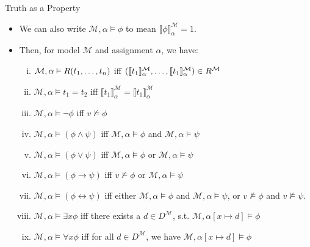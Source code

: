 \begin{frame}{Truth as a Property}

	\begin{itemize}%
	\itemsep=16pt
	
		\item We can also write $\mathcal{M},\alpha\vDash\phi$ to mean $\llbracket\phi\rrbracket^\mathcal{M}_\alpha=1$.
		
		\item Then, for model $\mathcal{M}$ and assignment $\alpha$, we have:

			\medskip
			
			\begin{enumerate}[(i)]
			\itemsep=6pt
			
				\item $\mathcal{M},\alpha\vDash R(t_1,\mathellipsis, t_n)$ iff $(\llbracket t_1\rrbracket^\mathcal{M}_\alpha,\mathellipsis, \llbracket t_1\rrbracket^\mathcal{M}_\alpha)\in R^\mathcal{M}$
				
				\item $\mathcal{M},\alpha\vDash t_1=t_2$ iff $\llbracket t_1\rrbracket^\mathcal{M}_\alpha=\llbracket t_1\rrbracket^\mathcal{M}_\alpha$								
				\item $\mathcal{M},\alpha\vDash \neg\phi$ iff $v\nvDash\phi$
					
				\item $\mathcal{M},\alpha\vDash(\phi\land\psi)$ iff $\mathcal{M},\alpha\vDash\phi$ and $\mathcal{M},\alpha\vDash\psi$
				
				\item $\mathcal{M},\alpha\vDash(\phi\lor\psi)$ iff $\mathcal{M},\alpha\vDash\phi$ or $\mathcal{M},\alpha\vDash\psi$
				
				\item $\mathcal{M},\alpha\vDash(\phi\to\psi)$ iff $v\nvDash\phi$ or $\mathcal{M},\alpha\vDash\psi$
				
				\item $\mathcal{M},\alpha\vDash(\phi\leftrightarrow\psi)$ iff   either $\mathcal{M},\alpha\vDash\phi$ and $\mathcal{M},\alpha\vDash\psi$, or $v\nvDash\phi$ and $v\nvDash\psi$.				
				\item $\mathcal{M},\alpha\vDash\exists x\phi$ iff there exists a $d\in D^\mathcal{M}$, s.t.  $\mathcal{M},{\alpha[x\mapsto d]}\vDash \phi$
				
				\item $\mathcal{M},\alpha\vDash\forall x\phi$ iff for all $d\in D^\mathcal{M}$, we have $\mathcal{M},{\alpha[x\mapsto d]}\vDash \phi$
											
			\end{enumerate}
	\end{itemize}

\end{frame}

